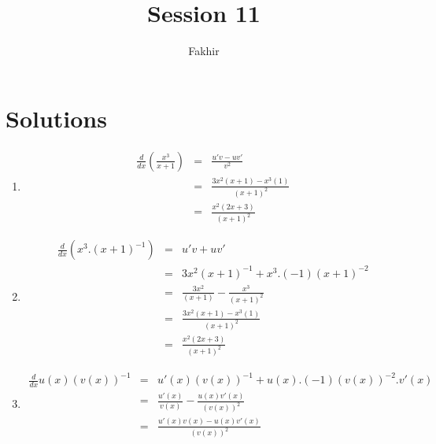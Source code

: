 \documentclass[]{article}
\title{Session 11}
\author{Fakhir}
\begin{document}
\maketitle

\section*{Solutions}

\begin{enumerate}[label=(\alph*)]
	\item
	\begin{eqnarray}
	\frac{d}{dx} \left( \frac{x^{3}}{x+1} \right) & = & \frac{u'v-uv'}{v^{2}} \\
		& = & \frac{3x^{2}(x+1)-x^{3}(1)}{(x+1)^{2}} \\
		& = & \frac{x^{2}(2x+3)}{(x+1)^2}
	\end{eqnarray}
	
	\item 
	\begin{eqnarray}
	\frac{d}{dx} \left( x^{3}.(x+1)^{-1} \right) & = & u'v + uv' \\
		& = & 3x^{2}(x+1)^{-1} + x^{3}.(-1)(x+1)^{-2} \\
		& = & \frac{3x^{2}}{(x+1)} - \frac{x^{3}}{(x+1)^{2}} \\
		& = & \frac{3x^{2}(x+1)-x^{3}(1)}{(x+1)^{2}} \\
		& = & \frac{x^{2}(2x+3)}{(x+1)^2}
	\end{eqnarray}
	
	\item 
		\begin{eqnarray}
	\frac{d}{dx} u(x)(v(x))^{-1} & = & u'(x)(v(x))^{-1} + u(x).(-1)(v(x))^{-2}.v'(x) \\		
		& = & \frac{u'(x)}{v(x)} - \frac{u(x)v'(x)}{(v(x))^2} \\
		& = & \frac{u'(x)v(x) - u(x)v'(x)}{(v(x))^{2}}
	\end{eqnarray}
	
\end{enumerate}
\end{document}
